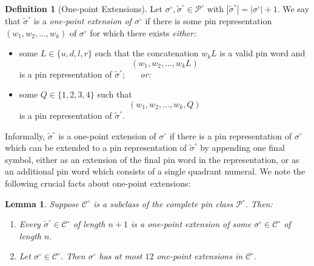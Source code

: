 \documentclass[11pt,a4paper]{article}
\newtheorem{lemma}[thm]{Lemma}
\theoremstyle{definition}
\newtheorem{defn}[thm]{Definition}
\newtheorem{comment}[thm]{Comment}
\begin{document}
\begin{defn}[One-point Extensions]
Let $\sigma^{\circ}, \widetilde{\sigma}^{\circ} \in \mathcal{P}^{\circ}$ with $|\widetilde{\sigma}^{\circ}| = |\sigma^{\circ}| + 1$. We say that $\widetilde{\sigma}^{\circ}$ is a \emph{one-point extension of $\sigma^{\circ}$} if there is some pin representation $\left(w_{1}, w_{2}, \dots, w_{k}\right)$ of $\sigma^{\circ}$ for which there exists \emph{either:}
\begin{itemize}
\item some $L \in \{u,d,l,r\}$ such that the concatenation $w_{k}L$ is a valid pin word and
\[
\left(w_{1}, w_{2}, \dots, w_{k}L\right)
\]
is a pin representation of $\widetilde{\sigma}^{\circ}$; \ \ \ \emph{or:}
\item some $Q \in \{1,2,3,4\}$ such that
\[
\left(w_{1}, w_{2}, \dots, w_{k}, Q\right)
\]
is a pin representation of $\widetilde{\sigma}^{\circ}$.
\end{itemize}
\end{defn}

Informally, $\widetilde{\sigma}^{\circ}$ is a one-point extension of $\sigma^{\circ}$ if there is a pin representation of $\sigma^{\circ}$ which can be extended to a pin representation of $\widetilde{\sigma}^{\circ}$ by appending one final symbol, either as an extension of the final pin word in the representation, or as an additional pin word which consists of a single quadrant numeral. We note the following crucial facts about one-point extensions:

\begin{lemma}\label{onepointfacts}
Suppose $\mathcal{C}^{\circ}$ is a subclass of the complete pin class $\mathcal{P}^{\circ}$. Then:
\begin{enumerate}
\item Every $\widetilde{\sigma}^{\circ} \in \mathcal{C}^{\circ}$ of length $n+1$ is a one-point extension of some $\sigma^{\circ} \in \mathcal{C}^{\circ}$ of length $n$.
\item Let $\sigma^{\circ} \in \mathcal{C}^{\circ}$. Then $\sigma^{\circ}$ has at most $12$ one-point extensions in $\mathcal{C}^{\circ}$.
\end{enumerate}
\end{lemma}

\end{document}
